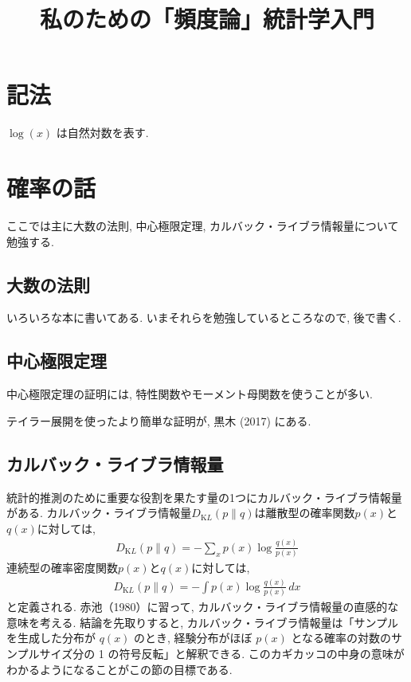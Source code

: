 \documentclass[a4paper, 12pt]{jarticle}
\title{私のための「頻度論」統計学入門}
\author{}
\begin{document}
\maketitle
\tableofcontents

\theoremstyle{definition}
\newtheorem{theorem}{定理}
\newtheorem*{theorem*}{定理}
\newtheorem{definition}[theorem]{定義}
\newtheorem*{definition*}{定義}

\newcommand{\KL}{D_{\mathrm KL}}

\section*{記法}

$\log(x)$ は自然対数を表す.

\section{確率の話}
ここでは主に大数の法則, 中心極限定理, カルバック・ライブラ情報量について勉強する.

\subsection{大数の法則}

いろいろな本に書いてある. いまそれらを勉強しているところなので,  後で書く.

\subsection{中心極限定理}

中心極限定理の証明には, 特性関数やモーメント母関数を使うことが多い. 

テイラー展開を使ったより簡単な証明が, 黒木 (2017) にある. 

\subsection{カルバック・ライブラ情報量}
統計的推測のために重要な役割を果たす量の1つにカルバック・ライブラ情報量がある.
カルバック・ライブラ情報量$\KL(p\|q)$は離散型の確率関数$p(x)$と$q(x)$に対しては, 
\begin{align}
\KL(p\|q) = -\sum_{x} p(x) \log \frac{q(x)}{p(x)}
\end{align}
連続型の確率密度関数$p(x)$と$q(x)$に対しては, 
\begin{align}
\KL(p\|q) = -\int p(x) \log \frac{q(x)}{p(x)} \, dx
\end{align}
と定義される. 
赤池（1980）に習って, カルバック・ライブラ情報量の直感的な意味を考える. 結論を先取りすると, カルバック・ライブラ情報量は「サンプルを生成した分布が $q(x)$ のとき, 経験分布がほぼ $p(x)$ となる確率の対数のサンプルサイズ分の 1 の符号反転」と解釈できる. このカギカッコの中身の意味がわかるようになることがこの節の目標である.
\end{document}
